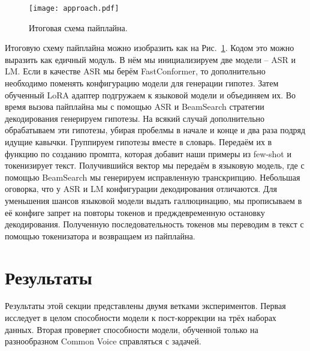 \begin{figure}[!t]
  \centering
  \texttt{[image: approach.pdf]}
  \caption{Итоговая схема пайплайна.}
  \label{fig:approach}
\end{figure}

Итоговую схему пайплайна можно изобразить как на Рис.~\ref{fig:approach}.
Кодом это можно выразить как едичный модуль.
В нём мы инициализируем две модели -- ASR и LM.
Если в качестве ASR мы берём FastConformer, то дополнительно необходимо поменять конфигурацию модели для генерации гипотез.
Затем обученный LoRA адаптер подгружаем к языковой модели и объединяем их.
Во время вызова пайплайна мы с помощью ASR и BeamSearch стратегии декодирования генерируем гипотезы.
На всякий случай дополнительно обрабатываем эти гипотезы, убирая пробелмы в начале и конце и два раза подряд идущие кавычки.
Группируем гипотезы вместе в словарь.
Передаём их в функцию по созданию промпта, которая добавит наши примеры из few-shot и токенизирует текст.
Получившийся вектор мы передаём в языковую модель, где с помощью BeamSearch мы генерируем исправленную транскрипцию.
Небольшая оговорка, что у ASR и LM конфигурации декодирования отличаются.
Для уменьшения шансов языковой модели выдать галлюцинацию, мы прописываем в её конфиге запрет на повторы токенов и предждевременную остановку декодирования.
Полученную последовательность токенов мы переводим в текст с помощью токенизатора и возвращаем из пайплайна.

\section{Результаты}

Результаты этой секции представлены двумя ветками экспериментов.
Первая исследует в целом способности модели к пост-коррекции на трёх наборах данных.
Вторая проверяет способности модели, обученной только на разнообразном Common Voice справляться с задачей.

